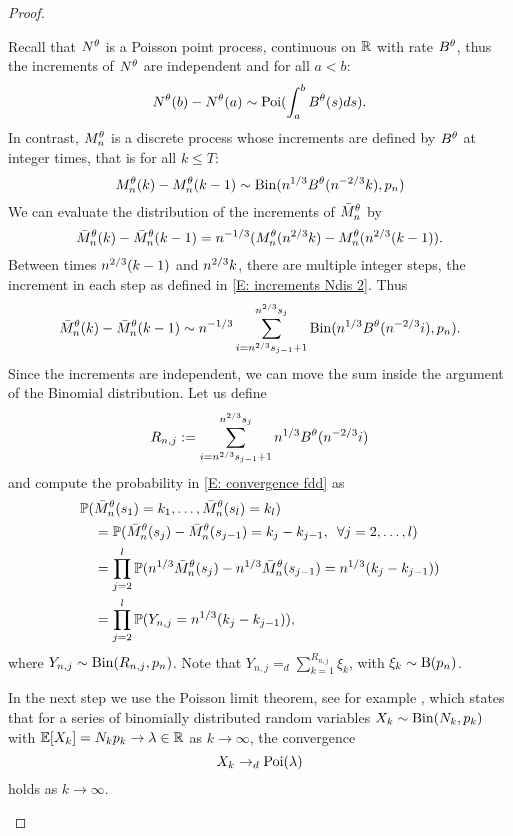 \begin{proof}
\begin{proofpart}
Recall that $N^{\theta}$ is a Poisson point process, continuous on $\mathbb{R}$ with rate $B^{\theta}$,
thus the increments of $N^{\theta}$ are independent and for all $a<b$: 
\begin{equation}
N^{\theta}(b) - N^{\theta}(a) \sim \operatorname*{Poi}( \int_{a}^{b} B^{\theta}(s)ds).
\end{equation}
In contrast, $M_n^{\theta}$ is a discrete process whose increments are defined by $B^{\theta}$ at integer times, 
that is for all $k \leq T$: 
\begin{equation} \label{E: increments Ndis 2}
M_n^{\theta}(k) - M_n^{\theta}(k-1) \sim \operatorname*{Bin}(n^{1 / 3}B^{\theta}(n^{-2 / 3}k), p_n)
\end{equation}
We can evaluate the distribution of the increments of $\bar{M}_n^{\theta}$ by
\begin{equation}
\bar{M}_n^{\theta}(k) - \bar{M}_n^{\theta}(k-1) = n^{-1 / 3}( M_n^{\theta}(n^{2 / 3}k) - M_n^{\theta}(n^{2 / 3}(k-1)).
\end{equation}
Between times $n^{2 / 3}(k-1)$ and $n^{2 / 3}k$, there are multiple integer steps,
the increment in each step as defined in \eqref{E: increments Ndis 2}. 
Thus
\begin{equation}
\bar{M}_n^{\theta}(k) - \bar{M}_n^{\theta}(k-1) \sim n^{-1 / 3} \sum_{i=n^{2 / 3}s_{j-1}+1}^{n^{2 / 3}s_j} \operatorname*{Bin}( n^{1 / 3}B^{\theta}(n^{-2 / 3}i), p_n ).
\end{equation}
Since the increments are independent, we can move the sum inside the argument of the Binomial distribution.
Let us define 
\begin{equation*}
R_{n,j} := \sum_{i=n^{2 / 3}s_{j-1}+1}^{n^{2 / 3}s_j}n^{1 / 3}B^{\theta}(n^{-2 / 3}i)
\end{equation*}
and compute the probability in \eqref{E: convergence fdd} as
\begin{equation} \label{E: distribution Ndis}
\begin{aligned}
&\mathbb{P}(\bar{M}_n^{\theta}(s_1) = k_1, \dots, \bar{M}_n^{\theta}(s_l) = k_l) \\
&\quad = \mathbb{P}( \bar{M}_n^{\theta}(s_j) - \bar{M}_n^{\theta}(s_{j-1}) = k_j - k_{j-1}, \enspace \forall j=2,\dots,l ) \\
&\quad = \prod_{j=2}^{l} \mathbb{P}( n^{1 / 3}\bar{M}_n^{\theta}(s_j) - n^{1 / 3}\bar{M}_n^{\theta}(s_{j-1}) = n^{1 / 3}(k_j - k_{j-1})) \\
&\quad = \prod_{j=2}^{l} \mathbb{P}( Y_{n,j} = n^{1 / 3}(k_j - k_{j-1}) ),
\end{aligned}
\end{equation}
where $Y_{n,j} \sim \operatorname*{Bin}(R_{n,j}, p_n)$.
Note that $Y_{n,j} =_d \sum_{k=1}^{R_{n,j}} \xi_k$, with $\xi_k \sim \operatorname*{B}(p_n)$.

In the next step we use the Poisson limit theorem, see for example \cite[Theorem 3.7, p.79]{Klenke2013},
which states that for a series of binomially distributed random variables $X_k \sim \operatorname*{Bin}(N_k, p_k)$
with $\mathbb{E}[X_k] = N_k p_k \rightarrow \lambda \in \mathbb{R}$ as $k \rightarrow \infty$,
the convergence 
\begin{equation}
	X_k \rightarrow_d \operatorname*{Poi}(\lambda)
\end{equation}
holds as $k \rightarrow \infty$.


\end{proofpart}
\end{proof}

